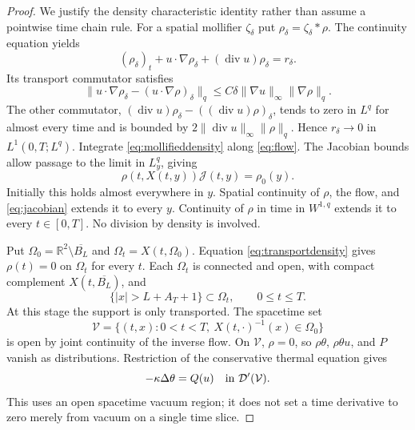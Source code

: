 \documentclass[11pt,letterpaper]{article}
\numberwithin{equation}{section}
\theoremstyle{definition}
\newcommand{\R}{\mathbb R}
\newcommand{\Div}{\operatorname{div}}
\newcommand{\norm}[2]{\lVert#1\rVert_{#2}}
\begin{document}
\begin{proof}
We justify the density characteristic identity rather than assume
a pointwise time chain rule. For a spatial mollifier $\zeta_\delta$
put $\rho_\delta=\zeta_\delta*\rho$. The continuity equation yields
\begin{equation}
 (\rho_\delta)_t+u\cdot\nabla\rho_\delta
           +(\Div u)\rho_\delta=r_\delta.
 \label{eq:mollifieddensity}
\end{equation}
Its transport commutator satisfies
\begin{equation}
 \norm{u\cdot\nabla\rho_\delta
               -(u\cdot\nabla\rho)_\delta}{q}
       \le C\delta\norm{\nabla u}{\infty}\norm{\nabla\rho}{q}.
 \label{eq:transportcommutator}
\end{equation}
The other commutator,
$(\Div u)\rho_\delta-((\Div u)\rho)_\delta$, tends to zero in $L^q$
for almost every time and is bounded by
$2\norm{\Div u}{\infty}\norm{\rho}{q}$.
Hence $r_\delta\to0$ in $L^1(0,T;L^q)$.
Integrate \eqref{eq:mollifieddensity} along \eqref{eq:flow}.
The Jacobian bounds allow passage to the limit in $L^q_y$, giving
\begin{equation}
 \rho(t,X(t,y))\mathcal J(t,y)=\rho_0(y).
 \label{eq:transportdensity}
\end{equation}
Initially this holds almost everywhere in $y$. Spatial continuity
of $\rho$, the flow, and \eqref{eq:jacobian} extends it to every $y$.
Continuity of $\rho$ in time in $W^{1,q}$ extends it to every
$t\in[0,T]$. No division by density is involved.

Put $\Omega_0=\R^2\setminus\overline{B_L}$ and
$\Omega_t=X(t,\Omega_0)$. Equation \eqref{eq:transportdensity} gives
$\rho(t)=0$ on $\Omega_t$ for every $t$. Each $\Omega_t$ is connected
and open, with compact complement $X(t,\overline{B_L})$, and
\begin{equation}
 \{|x|>L+A_T+1\}\subset\Omega_t,\qquad 0\le t\le T.
 \label{eq:commonexterior}
\end{equation}
At this stage the support is only transported.
The spacetime set
\[
 \mathcal V=\{(t,x):0<t<T,\ X(t,\cdot)^{-1}(x)\in\Omega_0\}
\]
is open by joint continuity of the inverse flow. On $\mathcal V$,
$\rho=0$, so $\rho\theta$, $\rho\theta u$, and $P$ vanish as
distributions. Restriction of the conservative thermal equation gives
\begin{equation}
 -\kappa\Delta\theta=Q(u)\quad\hbox{in }\mathcal D'(\mathcal V).
 \label{eq:vacuumthermal}
\end{equation}
This uses an open spacetime vacuum region; it does not set a time
derivative to zero merely from vacuum on a single time slice.


\end{proof}
\end{document}
